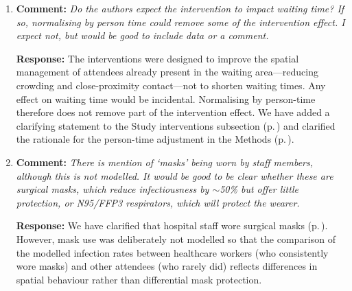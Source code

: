 \documentclass[11pt]{article}
\newcommand{\comment}[1]{\textbf{Comment:} \textit{#1}}
\newcommand{\response}[1]{\textbf{Response:} #1}
\begin{document}
\begin{enumerate}[label=\textbf{R2.\arabic*.}, leftmargin=*, start=28]
\response{We thank the reviewer for this correction. We have reviewed the literature and agree that the original assumption of HIV-positive patients being six times more infectious was not supported by the broader evidence. As the reviewer notes, the high quanta generation rates estimated in \citeauthor{escombe2007ClinInfectDis}'s animal chamber work likely reflected advanced drug-resistant TB rather than HIV status per se. We have revised this sensitivity analysis: based on \citet{martinez2021ClinInfectDis}, we now assume that HIV-positive TB patients generate quanta at a 33\% lower rate than HIV-negative patients, reflecting evidence that HIV-associated immunocompromise reduces infectiousness. We have updated the Methods (p.\,\pageref{chg:R2.31}) and re-ran the sensitivity analysis accordingly. Under this revised assumption, the expected number of \emph{Mtb} infections was 3\% (95\% quantile --20--0) lower than in the main analysis, consistent with the reviewer's expectation that HIV-associated immunocompromise reduces infectiousness.}

\item\label{r:2.32} \comment{Do the authors expect the intervention to impact waiting time? If so, normalising by person time could remove some of the intervention effect. I expect not, but would be good to include data or a comment.}

\response{The interventions were designed to improve the spatial management of attendees already present in the waiting area---reducing crowding and close-proximity contact---not to shorten waiting times. Any effect on waiting time would be incidental. Normalising by person-time therefore does not remove part of the intervention effect. We have added a clarifying statement to the Study interventions subsection (p.\,\pageref{chg:R2.32}) and clarified the rationale for the person-time adjustment in the Methods (p.\,\pageref{chg:R2.6}).}

\item\label{r:2.33} \comment{There is mention of `masks' being worn by staff members, although this is not modelled. It would be good to be clear whether these are surgical masks, which reduce infectiousness by $\sim$50\% but offer little protection, or N95/FFP3 respirators, which will protect the wearer.}

\response{We have clarified that hospital staff wore surgical masks (p.\,\pageref{chg:R2.33}). However, mask use was deliberately not modelled so that the comparison of the modelled infection rates between healthcare workers (who consistently wore masks) and other attendees (who rarely did) reflects differences in spatial behaviour rather than differential mask protection.}


\end{enumerate}
\end{document}
